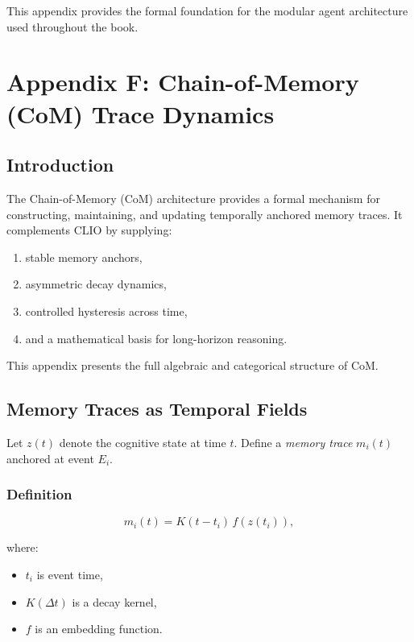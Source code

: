 \documentclass[12pt,oneside]{book}
\theoremstyle{plain}
\theoremstyle{definition}
\begin{document}
This appendix provides the formal foundation for the modular agent architecture
used throughout the book.

\chapter{Appendix F: Chain-of-Memory (CoM) Trace Dynamics}
\label{appendix:CoM}

\section{Introduction}

The Chain-of-Memory (CoM) architecture provides a formal mechanism for
constructing, maintaining, and updating temporally anchored memory traces.
It complements CLIO by supplying:

\begin{enumerate}
    \item stable memory anchors,
    \item asymmetric decay dynamics,
    \item controlled hysteresis across time,
    \item and a mathematical basis for long-horizon reasoning.
\end{enumerate}

This appendix presents the full algebraic and categorical structure of CoM.

\section{Memory Traces as Temporal Fields}

Let $z(t)$ denote the cognitive state at time $t$.
Define a \emph{memory trace} $m_i(t)$ anchored at event $E_i$.

\subsection{Definition}

\[
m_i(t) = K(t - t_i)\, f\!\left( z(t_i) \right),
\]

where:

\begin{itemize}
    \item $t_i$ is event time,
    \item $K(\Delta t)$ is a decay kernel,
    \item $f$ is an embedding function.
\end{itemize}
\end{document}
